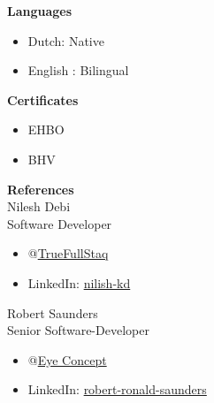 \documentclass[11pt, twoside, a4paper, titlepage]{article}
\begin{document}
\begin{tcolorbox}[boxsep=0mm, left=0mm, right=0mm, top=0mm, bottom=0mm, height=23cm]
\begin{minipage}[t]{6.01cm}
\begin{tcolorbox}[colframe=black, colback=black, arc=0mm, sharp corners, fontupper=\color{white}, height=22.9cm]
			\textbf{Languages}\\
			\vspace*{-0.6cm}
			\begin{itemize}
				\item Dutch: Native
				\item English : Bilingual
			\end{itemize}
			
			\vspace*{0.4cm}

			\textbf{Certificates}\\
			\vspace*{-0.6cm}
			\begin{itemize}
				\item EHBO
				\item BHV
			\end{itemize}
			
			\vspace*{0.4cm}


			\textbf{References}\\
			\small{Nilesh Debi\\ Software Developer\\}
			\vspace*{-0.6cm}
			\begin{itemize}
				\item @\href{https://www.truefullstaq.com/}{TrueFullStaq}
				\item LinkedIn: \href{https://www.linkedin.com/in/nilesh-kd}{nilish-kd}
			\end{itemize}
			
			\vspace*{0.2cm}
			
			\small{Robert Saunders\\ Senior Software-Developer\\}
			\vspace*{-0.6cm}
			\begin{itemize}
				\item @\href{https://www.eyeconcept.nl/}{Eye Concept}
				\item LinkedIn: \href{https://www.linkedin.com/in/robert-ronald-saunders}{robert-ronald-saunders}
			\end{itemize}
			
			\vspace*{0.1cm}
			
		\end{tcolorbox}
	\end{minipage}
	\vspace*{-0.3cm}
	\begin{minipage}[t]{14cm}
		\begin{tcolorbox}[grow to left by=0.0cm, colframe=white, colback=white, height=22.9cm]

\end{tcolorbox}
\end{minipage}
\end{tcolorbox}
\end{document}
